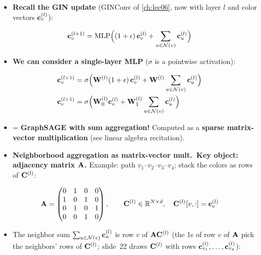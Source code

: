 \begin{itemize}
  \item \textbf{Recall the GIN update} (GINConv of \cref{ch:lec06}, now with layer
    $l$ and color vectors $\mathbf{c}_v^{(l)}$):
\end{itemize}
\begin{equation}\label{eq:lec07-gin}
  \mathbf{c}_v^{(l+1)} = \mathrm{MLP}\Big((1+\epsilon)\,\mathbf{c}_v^{(l)}
    + \sum_{u\in\mathcal{N}(v)}\mathbf{c}_u^{(l)}\Big)
\end{equation}
\begin{itemize}
  \item \textbf{We can consider a single-layer MLP} ($\sigma$ is a pointwise
    activation):
\end{itemize}
\begin{align}
  \mathbf{c}_v^{(l+1)} &= \sigma\Big(\mathbf{W}^{(l)}(1+\epsilon)\,\mathbf{c}_v^{(l)}
    + \mathbf{W}^{(l)}\sum_{u\in\mathcal{N}(v)}\mathbf{c}_u^{(l)}\Big)\label{eq:lec07-gin1}\\
  \mathbf{c}_v^{(l+1)} &= \sigma\Big(\mathbf{W}_0^{(l)}\mathbf{c}_v^{(l)}
    + \mathbf{W}_1^{(l)}\sum_{u\in\mathcal{N}(v)}\mathbf{c}_u^{(l)}\Big)\label{eq:lec07-gin2}
\end{align}
\begin{itemize}
  \item {} = \textbf{GraphSAGE with sum aggregation!} Computed as a
    \textbf{sparse matrix-vector multiplication} (see linear algebra recitation).
  \item \textbf{Neighborhood aggregation as matrix-vector mult.\ Key object:
    adjacency matrix $\mathbf{A}$.} Example: path $v_1$--$v_2$--$v_3$--$v_4$; stack the
    colors as rows of $\mathbf{C}^{(l)}$:
\end{itemize}
\begin{equation}\label{eq:lec07-Apath}
  \mathbf{A}=\begin{pmatrix}0&1&0&0\\1&0&1&0\\0&1&0&1\\0&0&1&0\end{pmatrix},
  \qquad
  \mathbf{C}^{(l)}\in\mathbb{R}^{N\times d},\quad \mathbf{C}^{(l)}[v,:]=\mathbf{c}_v^{(l)}
\end{equation}
\begin{itemize}
  \item The neighbor sum $\sum_{u\in\mathcal{N}(v)}\mathbf{c}_u^{(l)}$ is row $v$ of
    $\mathbf{A}\mathbf{C}^{(l)}$ (the 1s of row $v$ of $\mathbf{A}$ pick the neighbors' rows of
    $\mathbf{C}^{(l)}$; slide~22 draws $\mathbf{C}^{(l)}$ with rows
    $\mathbf{c}^{(l)}_{v_1},\dots,\mathbf{c}^{(l)}_{v_4}$):
\end{itemize}
